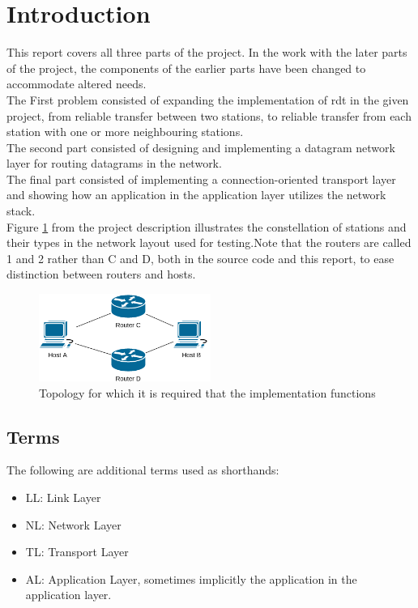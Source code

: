 \section{Introduction}

This report covers all three parts of the project. In the work with the later parts of the project, the components of the earlier parts have been changed to accommodate altered needs.\\
The First problem consisted of expanding the implementation of rdt in the given project, from reliable transfer between two stations, to reliable transfer from each station with one or more neighbouring stations.\\
The second part consisted of designing and implementing a datagram network layer for routing datagrams in the network.\\
The final part consisted of implementing a connection-oriented transport layer and showing how an application in the application layer utilizes the network stack.\\

Figure \ref{fig:GivenTopology} from the project description illustrates the constellation of stations and their types in the network layout used for testing.Note that the routers are called 1 and 2 rather than C and D, both in the source code and this report, to ease distinction between routers and hosts.
\begin{figure}[H]
\centering
\includegraphics[width=0.5\textwidth]{../figs/network-topology.png}
\caption{Topology for which it is required that the implementation functions}
\label{fig:GivenTopology}
\end{figure}


\subsection{Terms}
The following are additional terms used as shorthands:
\begin{itemize}
\item LL: Link Layer
\item NL: Network Layer
\item TL: Transport Layer
\item AL: Application Layer, sometimes implicitly the application in the application layer.
\end{itemize}
